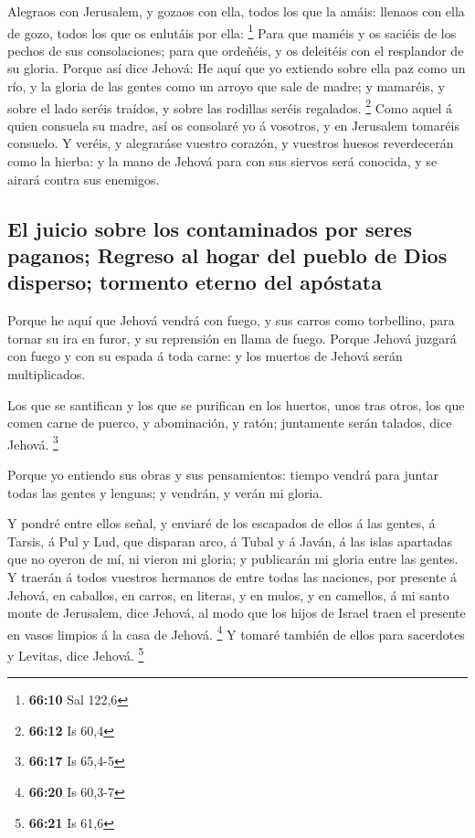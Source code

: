  Alegraos con Jerusalem, y gozaos con ella, todos los que
la amáis: llenaos con ella de gozo, todos los que os enlutáis por ella:
\footnote{\textbf{66:10} Sal 122,6}  Para que maméis y os
saciéis de los pechos de sus consolaciones; para que ordeñéis, y os
deleitéis con el resplandor de su gloria.  Porque así
dice Jehová: He aquí que yo extiendo sobre ella paz como un río, y la
gloria de las gentes como un arroyo que sale de madre; y mamaréis, y
sobre el lado seréis traídos, y sobre las rodillas seréis regalados.
\footnote{\textbf{66:12} Is 60,4}  Como aquel á quien
consuela su madre, así os consolaré yo á vosotros, y en Jerusalem
tomaréis consuelo.  Y veréis, y alegraráse vuestro
corazón, y vuestros huesos reverdecerán como la hierba: y la mano de
Jehová para con sus siervos será conocida, y se airará contra sus
enemigos.

\hypertarget{el-juicio-sobre-los-contaminados-por-seres-paganos-regreso-al-hogar-del-pueblo-de-dios-disperso-tormento-eterno-del-apuxf3stata}{%
\subsection{El juicio sobre los contaminados por seres paganos; Regreso
al hogar del pueblo de Dios disperso; tormento eterno del
apóstata}\label{el-juicio-sobre-los-contaminados-por-seres-paganos-regreso-al-hogar-del-pueblo-de-dios-disperso-tormento-eterno-del-apuxf3stata}}

 Porque he aquí que Jehová vendrá con fuego, y sus carros
como torbellino, para tornar su ira en furor, y su reprensión en llama
de fuego.  Porque Jehová juzgará con fuego y con su
espada á toda carne: y los muertos de Jehová serán multiplicados.

 Los que se santifican y los que se purifican en los
huertos, unos tras otros, los que comen carne de puerco, y abominación,
y ratón; juntamente serán talados, dice Jehová. \footnote{\textbf{66:17}
  Is 65,4-5}

 Porque yo entiendo sus obras y sus pensamientos: tiempo
vendrá para juntar todas las gentes y lenguas; y vendrán, y verán mi
gloria.

 Y pondré entre ellos señal, y enviaré de los escapados
de ellos á las gentes, á Tarsis, á Pul y Lud, que disparan arco, á Tubal
y á Javán, á las islas apartadas que no oyeron de mí, ni vieron mi
gloria; y publicarán mi gloria entre las gentes.  Y
traerán á todos vuestros hermanos de entre todas las naciones, por
presente á Jehová, en caballos, en carros, en literas, y en mulos, y en
camellos, á mi santo monte de Jerusalem, dice Jehová, al modo que los
hijos de Israel traen el presente en vasos limpios á la casa de Jehová.
\footnote{\textbf{66:20} Is 60,3-7}  Y tomaré también de
ellos para sacerdotes y Levitas, dice Jehová. \footnote{\textbf{66:21}
  Is 61,6}

